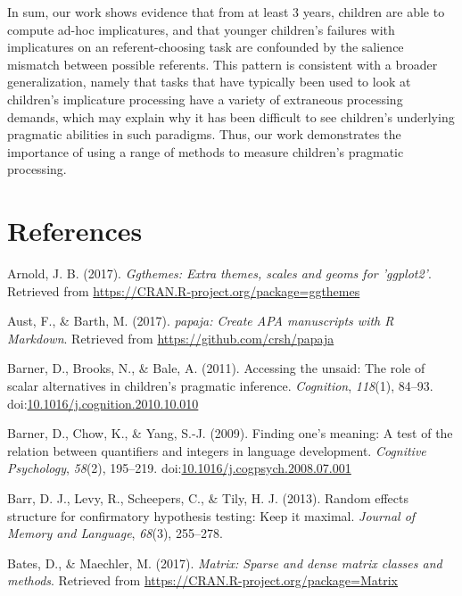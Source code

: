 \documentclass[man]{apa6}
\theoremstyle{definition}
\theoremstyle{definition}
\theoremstyle{definition}
\theoremstyle{remark}
\begin{document}
In sum, our work shows evidence that from at least 3 years, children are
able to compute ad-hoc implicatures, and that younger children's
failures with implicatures on an referent-choosing task are confounded
by the salience mismatch between possible referents. This pattern is
consistent with a broader generalization, namely that tasks that have
typically been used to look at children's implicature processing have a
variety of extraneous processing demands, which may explain why it has
been difficult to see children's underlying pragmatic abilities in such
paradigms. Thus, our work demonstrates the importance of using a range
of methods to measure children's pragmatic processing.

\newpage

\section{References}\label{references}

\setlength{\parindent}{-0.5in} \setlength{\leftskip}{0.5in}

\hypertarget{refs}{}
\hypertarget{ref-R-ggthemes}{}
Arnold, J. B. (2017). \emph{Ggthemes: Extra themes, scales and geoms for
'ggplot2'}. Retrieved from
\url{https://CRAN.R-project.org/package=ggthemes}

\hypertarget{ref-R-papaja}{}
Aust, F., \& Barth, M. (2017). \emph{papaja: Create APA manuscripts with
R Markdown}. Retrieved from \url{https://github.com/crsh/papaja}

\hypertarget{ref-barner2011}{}
Barner, D., Brooks, N., \& Bale, A. (2011). Accessing the unsaid: The
role of scalar alternatives in children's pragmatic inference.
\emph{Cognition}, \emph{118}(1), 84--93.
doi:\href{https://doi.org/10.1016/j.cognition.2010.10.010}{10.1016/j.cognition.2010.10.010}

\hypertarget{ref-barner2009}{}
Barner, D., Chow, K., \& Yang, S.-J. (2009). Finding one's meaning: A
test of the relation between quantifiers and integers in language
development. \emph{Cognitive Psychology}, \emph{58}(2), 195--219.
doi:\href{https://doi.org/10.1016/j.cogpsych.2008.07.001}{10.1016/j.cogpsych.2008.07.001}

\hypertarget{ref-barr2013random}{}
Barr, D. J., Levy, R., Scheepers, C., \& Tily, H. J. (2013). Random
effects structure for confirmatory hypothesis testing: Keep it maximal.
\emph{Journal of Memory and Language}, \emph{68}(3), 255--278.

\hypertarget{ref-R-Matrix}{}
Bates, D., \& Maechler, M. (2017). \emph{Matrix: Sparse and dense matrix
classes and methods}. Retrieved from
\url{https://CRAN.R-project.org/package=Matrix}
\end{document}
